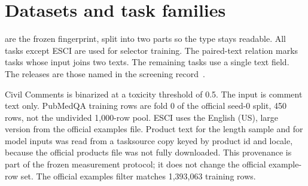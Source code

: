 \section{Datasets and task families}
\label{sec:datasets}

 are the frozen fingerprint, split into two parts so the type stays readable. All tasks except ESCI are used for selector training. The paired-text relation marks tasks whose input joins two texts. The remaining tasks use a single text field. The releases are those named in the screening record~\citep{casanueva2020,larson2019,civilcomments,smsspam,chalkidis2021,jin2019,schuster2021,reddy2022}.



Civil Comments is binarized at a toxicity threshold of 0.5. The input is comment text only. PubMedQA training rows are fold 0 of the official seed-0 split, 450 rows, not the undivided 1{,}000-row pool. ESCI uses the English (US), large version from the official examples file. Product text for the length sample and for model inputs was read from a tasksource copy keyed by product id and locale, because the official products file was not fully downloaded. This provenance is part of the frozen measurement protocol; it does not change the official example-row set. The official examples filter matches 1{,}393{,}063 training rows.
